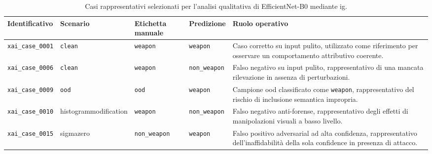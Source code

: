 \begin{table}[htbp]
\centering
\small
\renewcommand{\arraystretch}{1.15}
\begin{tabular}{p{} p{} p{} p{} p{}}
\toprule
\textbf{Identificativo} &
\textbf{Scenario} &
\textbf{Etichetta manuale} &
\textbf{Predizione} &
\textbf{Ruolo operativo} \\
\midrule

\texttt{xai\_case\_0001} &
\texttt{clean} &
\texttt{weapon} &
\texttt{weapon} &
Caso corretto su input pulito, utilizzato come riferimento per osservare un comportamento attributivo coerente. \\

\texttt{xai\_case\_0006} &
\texttt{clean} &
\texttt{weapon} &
\texttt{non\_weapon} &
Falso negativo su input pulito, rappresentativo di una mancata rilevazione in assenza di perturbazioni. \\

\texttt{xai\_case\_0009} &
\texttt{ood} &
\texttt{ood} &
\texttt{weapon} &
Campione \gls{ood} classificato come \texttt{weapon}, rappresentativo del rischio di inclusione semantica impropria. \\

\texttt{xai\_case\_0010} &
\gls{histogrammodification} &
\texttt{weapon} &
\texttt{non\_weapon} &
Falso negativo anti-forense, rappresentativo degli effetti di manipolazioni visuali a basso livello. \\

\texttt{xai\_case\_0015} &
\gls{sigmazero} &
\texttt{non\_weapon} &
\texttt{weapon} &
Falso positivo adversarial ad alta confidenza, rappresentativo dell'inaffidabilità della sola confidence in presenza di attacco. \\

\bottomrule
\end{tabular}
\caption{Casi rappresentativi selezionati per l'analisi qualitativa di EfficientNet-B0 mediante \gls{ig}.}
\label{tab:results-xai-cases}
\end{table}

